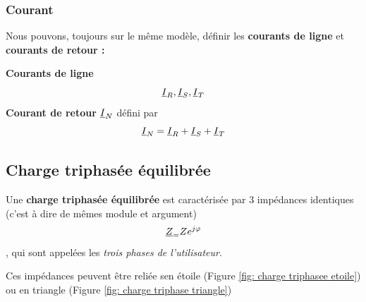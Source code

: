 \documentclass[12pt,a4paper]{article}
\newcommand{\uz}{\uline{Z} }
\newcommand{\ui}{\uline{I} }
\begin{document}
\subsubsection{Courant}
Nous pouvons, toujours sur le même modèle, définir les \textbf{courants de ligne} et \textbf{courants de retour :} 
\begin{blackbox}
	\textbf{Courants de ligne}
	\[\ui_R, \ui_S, \ui_T\] 
	\textbf{Courant de retour} $\ui_N$ défini par
	\begin{equation}
		\ui_N = \ui_R + \ui_S + \ui_T
	\end{equation}
\end{blackbox}

\subsection{Charge triphasée équilibrée}
Une \textbf{charge triphasée équilibrée} est caractérisée par 3 impédances identiques (c'est à dire de mêmes module et argument) 
\[\uz_ = Ze^{j\varphi}\], qui sont appelées les \textit{trois phases de l'utilisateur}. 

Ces impédances peuvent être reliée sen étoile (Figure \ref{fig: charge triphasee etoile}) ou en triangle (Figure \ref{fig: charge triphase triangle})
\end{document}
